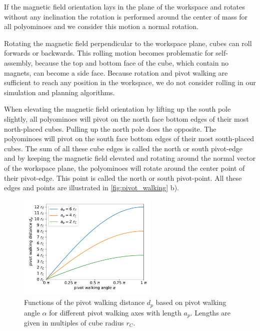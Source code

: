 If the magnetic field orientation lays in the plane of the workspace and rotates without any inclination the rotation is performed around the center of mass for all polyominoes and we consider this motion a normal rotation.

Rotating the magnetic field perpendicular to the workspace plane, cubes can roll forwards or backwards.
This rolling motion becomes problematic for self-assembly, because the top and bottom face of the cube, which contain no magnets, can become a side face.
Because rotation and pivot walking are sufficient to reach any position in the workspace, we do not consider rolling in our simulation and planning algorithms.

When elevating the magnetic field orientation by lifting up the south pole slightly, all polyominoes will pivot on the north face bottom edges of their most north-placed cubes.
Pulling up the north pole does the opposite. The polyominoes will pivot on the south face bottom edges of their most south-placed cubes.
The sum of all these cube edges is called the north or south pivot-edge and by keeping the magnetic field elevated and rotating around the normal vector of the workspace plane, the polyominoes will rotate around the center point of their pivot-edge.
This point is called the north or south pivot-point.
All these edges and points are illustrated in \autoref{fig:pivot_walking} b).

\begin{figure}
	\centering
	\includegraphics[width=0.60\textwidth]{figures/plots/pivot_walking_angle.pdf}
	\caption[Functions of $d_p$ based on $\alpha$ for different $a_p$]{Functions of the pivot walking distance $d_p$ based on pivot walking angle $\alpha$ for different pivot walking axes with length $a_p$. Lengths are given in multiples of cube radius $r_C$.}
	\label{fig:pw_angle_plot}
\end{figure}

